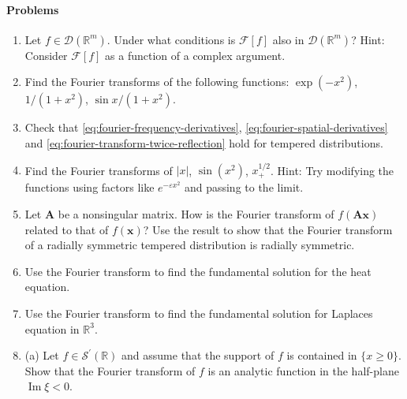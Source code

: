 \paragraph*{Problems}

\begin{enumerate}[label=\thesection.\arabic*.,ref=\thesection.\arabic*,start=45,series=book-problems]

\item\label{ex:compact-fourier-compact-support} Let $f\in\mathcal{D}(\mathbb{R}^m)$. Under what conditions is $\mathcal{F}[f]$ also in $\mathcal{D}(\mathbb{R}^m)$? Hint: Consider $\mathcal{F}[f]$ as a function of a complex argument.

\item\label{ex:fourier-gaussian-rational-transforms} Find the Fourier transforms of the following functions: $\exp(-x^2)$, $1/(1+x^2)$, $\sin x/(1+x^2)$.

\item\label{ex:tempered-fourier-differentiation-reflection} Check that \eqref{eq:fourier-frequency-derivatives}, \eqref{eq:fourier-spatial-derivatives} and \eqref{eq:fourier-transform-twice-reflection} hold for tempered distributions.

\item\label{ex:fourier-polynomial-growth-regularizations} Find the Fourier transforms of $|x|$, $\sin(x^2)$, $x_+^{1/2}$. Hint: Try modifying the functions using factors like $e^{-\varepsilon x^2}$ and passing to the limit.

\item\label{ex:fourier-linear-change-radial-symmetry} Let $\bm{A}$ be a nonsingular matrix. How is the Fourier transform of $f(\bm{A}\bm{x})$ related to that of $f(\bm{x})$? Use the result to show that the Fourier transform of a radially symmetric tempered distribution is radially symmetric.

\item\label{ex:fourier-heat-fundamental-solution} Use the Fourier transform to find the fundamental solution for the heat equation.

\item\label{ex:fourier-laplace-fundamental-three-dimensions} Use the Fourier transform to find the fundamental solution for Laplace\textquotesingle s equation in $\mathbb{R}^3$.

\item\label{ex:one-sided-tempered-fourier-product} (a) Let $f\in\mathcal{S}^{\prime}(\mathbb{R})$ and assume that the support of $f$ is contained in $\{x\geq0\}$. Show that the Fourier transform of $f$ is an analytic function in the half-plane $\operatorname{Im}\xi<0$.


\end{enumerate}
